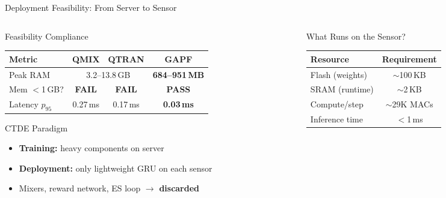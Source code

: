 \documentclass[aspectratio=169, 11pt]{beamer}
\begin{document}
\begin{frame}{Deployment Feasibility: From Server to Sensor}
\vspace{-2pt}
\begin{columns}[T]
\begin{column}{0.50\textwidth}

  \begin{block}{Feasibility Compliance}
  \centering
  \footnotesize
  \renewcommand{\arraystretch}{1.15}
  \begin{tabular}{l|cc|c}
    \toprule
    \textbf{Metric} & \textbf{QMIX} & \textbf{QTRAN} & \textbf{GAPF} \\
    \midrule
    Peak RAM & \multicolumn{2}{c|}{3.2--13.8\,GB} & \textbf{684--951\,MB} \\
    Mem $<$1\,GB? & \textcolor{polyred}{\textbf{FAIL}} & \textcolor{polyred}{\textbf{FAIL}} & \textcolor{polygreen}{\textbf{PASS}} \\
    Latency $p_{95}$ & 0.27\,ms & 0.17\,ms & \textbf{0.03\,ms} \\
    \bottomrule
  \end{tabular}
  \end{block}

  \medskip
  \begin{exampleblock}{CTDE Paradigm}
    \begin{itemize}
      \item \textbf{Training:} heavy components on server
      \item \textbf{Deployment:} only lightweight GRU on each sensor
      \item Mixers, reward network, ES loop $\to$ \textbf{discarded}
    \end{itemize}
  \end{exampleblock}

\end{column}
\begin{column}{0.47\textwidth}

  \begin{block}{What Runs on the Sensor?}
  \centering
  \footnotesize
  \renewcommand{\arraystretch}{1.15}
  \begin{tabular}{lc}
    \toprule
    \textbf{Resource} & \textbf{Requirement} \\
    \midrule
    Flash (weights) & $\sim$100\,KB \\
    SRAM (runtime) & $\sim$2\,KB \\
    Compute/step & $\sim$29K MACs \\
    Inference time & $<$1\,ms \\
    \bottomrule
  \end{tabular}


\end{block}
\end{column}
\end{columns}
\end{frame}
\end{document}
